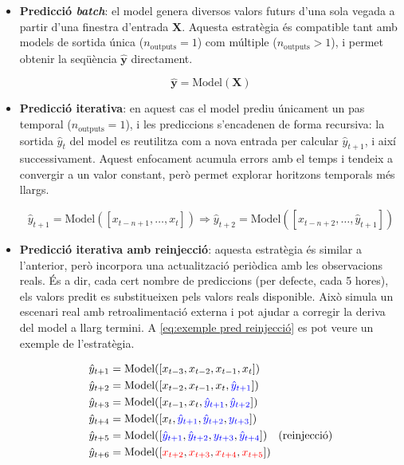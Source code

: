 \documentclass[../main.tex]{subfiles}
\begin{document}
\begin{itemize}
    \item \textbf{Predicció \textit{batch}}: el model genera diversos valors futurs d’una sola vegada a partir d’una finestra d’entrada $\mathbf{X}$. Aquesta estratègia és compatible tant amb models de sortida única ($n_{\text{outputs}} = 1$) com múltiple ($n_{\text{outputs}} > 1$), i permet obtenir la seqüència $\mathbf{\hat{y}}$ directament.

    \begin{equation}
        \hat{\mathbf{y}} = \text{Model}(\mathbf{X})
    \end{equation}

    \item \textbf{Predicció iterativa}: en aquest cas el model prediu únicament un pas temporal ($n_{\text{outputs}} = 1$), i les prediccions s’encadenen de forma recursiva: la sortida $\hat{y}_t$ del model es reutilitza com a nova entrada per calcular $\hat{y}_{t+1}$, i així successivament. Aquest enfocament acumula errors amb el temps i tendeix a convergir a un valor constant, però permet explorar horitzons temporals més llargs.

    \begin{equation}
        \hat{y}_{t+1} = \text{Model}([x_{t-n+1}, \dots, x_t]) \Rightarrow \hat{y}_{t+2} = \text{Model}([x_{t-n+2}, \dots, \hat{y}_{t+1}])
    \end{equation}

    \item \textbf{Predicció iterativa amb reinjecció}: aquesta estratègia és similar a l’anterior, però incorpora una actualització periòdica amb les observacions reals. És a dir, cada cert nombre de prediccions (per defecte, cada 5 hores), els valors predit es substitueixen pels valors reals disponible. Això simula un escenari real amb retroalimentació externa i pot ajudar a corregir la deriva del model a llarg termini. A \cref{eq:exemple pred reinjecció} es pot veure un exemple de l'estratègia.
    
\begin{equation}
\begin{aligned}
\hat{y}_{t+1} &= \text{Model}([x_{t-3}, x_{t-2}, x_{t-1}, x_t]) \\
\hat{y}_{t+2} &= \text{Model}([x_{t-2}, x_{t-1}, x_t, \textcolor{blue}{\hat{y}_{t+1}}]) \\
\hat{y}_{t+3} &= \text{Model}([x_{t-1}, x_t, \textcolor{blue}{\hat{y}_{t+1}}, \textcolor{blue}{\hat{y}_{t+2}}]) \\
\hat{y}_{t+4} &= \text{Model}([x_t, \textcolor{blue}{\hat{y}_{t+1}}, \textcolor{blue}{\hat{y}_{t+2}}, \textcolor{blue}{y_{t+3}}]) \\
\hat{y}_{t+5} &= \text{Model}([\textcolor{blue}{\hat{y}_{t+1}}, \textcolor{blue}{\hat{y}_{t+2}}, \textcolor{blue}{y_{t+3}}, \textcolor{blue}{\hat{y}_{t+4}}]) \quad \text{(reinjecció)} \\
\hat{y}_{t+6} &= \text{Model}([\textcolor{red}{x_{t+2}}, \textcolor{red}{x_{t+3}}, \textcolor{red}{x_{t+4}}, \textcolor{red}{x_{t+5}}])
\end{aligned}
\label{eq:exemple pred reinjecció}
\end{equation}


\end{itemize}
\end{document}
